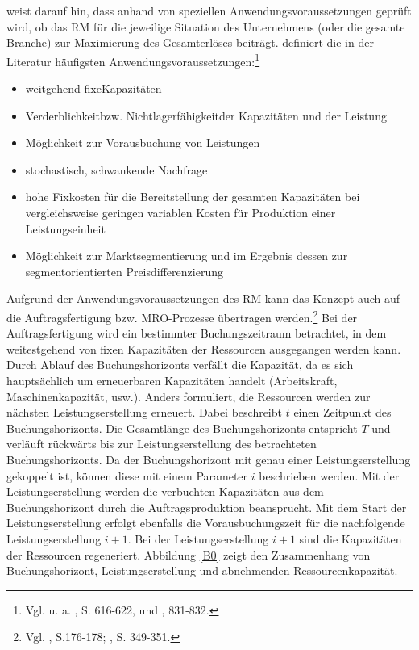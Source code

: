 \cite{Petrick:2009aa} weist da\-rauf hin, dass anhand von speziellen Anwendungsvoraussetzungen geprüft wird, ob das RM für die jeweilige Situation des Unternehmens (oder die gesamte Branche) zur Maximierung des Gesamterlöses beiträgt. \cite{kimes1989yield} definiert die in der Literatur häufigsten Anwendungsvoraussetzungen:\footnote{Vgl. u. a. \cite{friege1996yield}, S. 616-622, und \cite{weatherford1992taxonomy}, 831-832.}
\begin{itemize}
	\item \glqq weitgehend fixe\grqq\;Kapazitäten
	\item \glqq Verderblichkeit\grqq\;bzw. \glqq Nichtlagerfähigkeit\grqq\;der Kapazitäten und der Leistung
	\item Möglichkeit zur Vorausbuchung von Leistungen
	\item stochastisch, schwankende Nachfrage
	\item hohe Fixkosten für die Bereitstellung der gesamten Kapazitäten bei vergleichsweise geringen variablen Kosten für Produktion einer Leistungseinheit
	\item Möglichkeit zur Marktsegmentierung und im Ergebnis dessen zur segmentorientierten Preisdifferenzierung
\end{itemize}
\vspace{0.2cm}
Aufgrund der Anwendungsvoraussetzungen des RM kann das Konzept auch auf die Auftragsfertigung bzw. MRO-Prozesse übertragen werden.\footnote{Vgl. \cite{hintsches2010revenue}, S.176-178; \cite{kimes1989yield}, S. 349-351.} Bei der Auftragsfertigung wird ein bestimmter Buchungszeitraum betrachtet, in dem weitestgehend von fixen Kapazitäten der Ressourcen ausgegangen werden kann. Durch Ablauf des Buchungshorizonts verfällt die Kapazität, da es sich hauptsächlich um erneuerbaren Kapazitäten handelt (Arbeitskraft, Maschinenkapazität, usw.). Anders formuliert, die Ressourcen werden zur nächsten Leistungserstellung erneuert. Dabei beschreibt $t$ einen Zeitpunkt des Buchungshorizonts. Die Gesamtlänge des Buchungshorizonts entspricht $T$ und verläuft rückwärts bis zur Leistungserstellung des betrachteten Buchungshorizonts. Da der Buchungshorizont mit genau einer Leistungserstellung gekoppelt ist, können diese mit einem Parameter $i$ beschrieben werden. Mit der Leistungserstellung werden die verbuchten Kapazitäten aus dem Buchungshorizont durch die Auftragsproduktion beansprucht. Mit dem Start der Leistungserstellung erfolgt ebenfalls die Vorausbuchungszeit für die nachfolgende Leistungserstellung $i+1$. Bei der Leistungserstellung $i+1$ sind die Kapazitäten der Ressourcen regeneriert. Abbildung \ref{B0} zeigt den Zusammenhang von Buchungshorizont, Leistungserstellung und abnehmenden Ressourcenkapazität.

